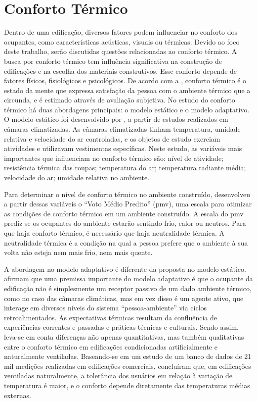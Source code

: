 \documentclass[brazil,hardcopy,openany]{ufscthesis} %
\begin{document}
\section{Conforto Térmico}

Dentro de uma edificação, diversos fatores podem influenciar no conforto dos ocupantes, como características acústicas, visuais ou térmicas. Devido ao foco deste trabalho, serão discutidas questões relacionadas ao conforto térmico.
A busca por conforto térmico tem influência significativa na construção de edificações e na escolha dos materiais construtivos. Esse conforto depende de fatores físicos, fisiológicos e psicológicos. De acordo com a , conforto térmico é o estado da mente que expressa satisfação da pessoa com o ambiente térmico que a circunda, e é estimado através de avaliação subjetiva. No estudo do conforto térmico há duas abordagens principais: o modelo estático e o modelo adaptativo. %
O modelo estático foi desenvolvido por , a partir de estudos realizados em câmaras climatizadas. As câmaras climatizadas tinham temperatura, umidade relativa e velocidade do ar controladas, e os objetos de estudo exerciam atividades e utilizavam vestimentas específicas. Neste estudo, as variáveis mais importantes que influenciam no conforto térmico são: nível de atividade; resistência térmica das roupas; temperatura do ar; temperatura radiante média; velocidade do ar; umidade relativa no ambiente.

Para determinar o nível de conforto térmico no ambiente construído,  desenvolveu a partir dessas variáveis o “Voto Médio Predito” (\acrshort{pmv}), uma escala para otimizar as condições de conforto térmico em um ambiente construído. A escala do \acrshort{pmv} prediz se os ocupantes do ambiente estarão sentindo frio, calor ou neutros. Para que haja conforto térmico, é necessário que haja neutralidade térmica. A neutralidade térmica é a condição na qual a pessoa prefere que o ambiente à sua volta não esteja nem mais frio, nem mais quente.

A abordagem no modelo adaptativo é diferente da proposta no modelo estático.  afirmam que uma premissa importante do modelo adaptativo é que o ocupante da edificação não é simplesmente um receptor passivo de um dado ambiente térmico, como no caso das câmaras climáticas, mas em vez disso é um agente ativo, que interage em diversos níveis do sistema “pessoa-ambiente” via ciclos retroalimentados. As expectativas térmicas resultam da confluência de experiências correntes e passadas e práticas técnicas e culturais. Sendo assim, leva-se em conta diferenças não apenas quantitativas, mas também qualitativas entre o conforto térmico em edificações condicionadas artificialmente e naturalmente ventiladas. Baseando-se em um estudo de um banco de dados de 21 mil medições realizadas em edificações comerciais,  concluíram que, em edificações ventiladas naturalmente, a tolerância dos usuários em relação à variação de temperatura é maior, e o conforto depende diretamente das temperaturas médias externas.
\end{document}
